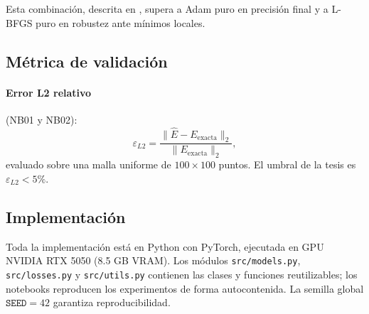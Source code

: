 Esta combinación, descrita en \citet{Wang2021_failurePINNs}, supera a Adam puro en
precisión final y a L-BFGS puro en robustez ante mínimos locales.

\subsection{Métrica de validación}
\label{subsec:metricas}

\paragraph{Error L2 relativo} (NB01 y NB02):
%
\begin{equation}
  \varepsilon_{L2} = \frac{\|\hat{E} - E_{\mathrm{exacta}}\|_2}{\|E_{\mathrm{exacta}}\|_2},
  \label{eq:l2}
\end{equation}
%
evaluado sobre una malla uniforme de $100 \times 100$ puntos.
El umbral de la tesis es $\varepsilon_{L2} < 5\%$.

\subsection{Implementación}
\label{subsec:implementacion}

Toda la implementación está en Python con PyTorch, ejecutada en GPU NVIDIA RTX 5050
(8.5 GB VRAM).
Los módulos \texttt{src/models.py}, \texttt{src/losses.py} y \texttt{src/utils.py}
contienen las clases y funciones reutilizables; los notebooks reproducen los experimentos
de forma autocontenida.
La semilla global $\texttt{SEED} = 42$ garantiza reproducibilidad.

